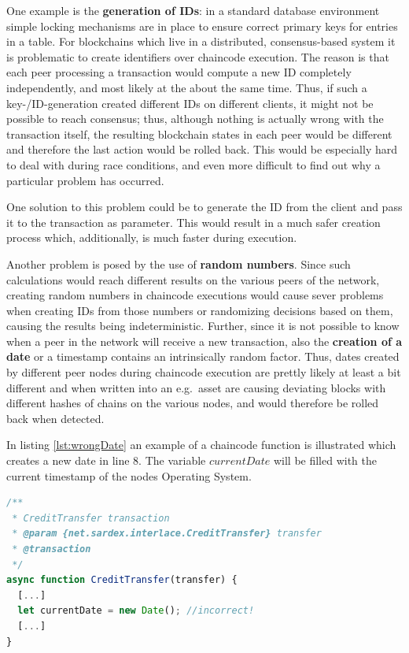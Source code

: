 One example is the \textbf{generation of IDs}: in a standard database environment simple locking mechanisms are in place to ensure correct primary keys for entries in a table. For blockchains which live in a distributed, consensus-based system it is problematic to create identifiers over chaincode execution. The reason is that each peer processing a transaction would compute a new ID completely independently, and most likely at the about the same time. Thus, if such a key-/ID-generation created different IDs on different clients, it might not be possible to reach consensus; thus, although nothing is actually wrong with the transaction itself, the resulting blockchain states in each peer would be different and therefore the last action would be rolled back. This would be especially hard to deal with during race conditions, and even more difficult to find out why a particular problem has occurred.

One solution to this problem could be to generate the ID from the client and pass it to the transaction as parameter. This would result in a much safer creation process which, additionally, is much faster during execution.

Another problem is posed by the use of \textbf{random numbers}. Since such calculations would reach different results on the various peers of the network,  creating random numbers in chaincode executions would cause sever problems when creating IDs from those numbers or randomizing decisions based on them, causing the results being indeterministic. Further, since it is not possible to know when a peer in the network will receive a new transaction, also the \textbf{creation of a date} or a timestamp contains an intrinsically random factor. Thus, dates created by different peer nodes during chaincode execution are prettly likely at least a bit different and when written into an e.g.\ asset are causing deviating blocks with different hashes of chains on the various nodes, and would therefore be rolled back when detected.

In listing \ref{lst:wrongDate} an example of a chaincode function is illustrated which creates a new date in line 8. The variable $currentDate$ will be filled with the current timestamp of the nodes Operating System.

\begin{center}
\begin{minipage}{0.8\textwidth}
\small
\begin{lstlisting}[language=javascript,firstnumber=1,caption={\bf\small An example of wrong determination of the current date inside of chain code}, captionpos=b,label=lst:wrongDate]
/**
 * CreditTransfer transaction
 * @param {net.sardex.interlace.CreditTransfer} transfer
 * @transaction
 */
async function CreditTransfer(transfer) {
  [...]
  let currentDate = new Date(); //incorrect!
  [...]
}
\end{lstlisting}
\end{minipage}
\end{center}

